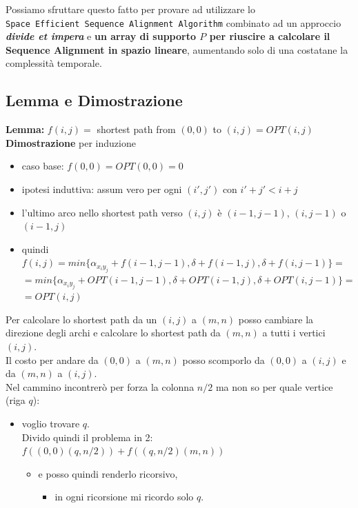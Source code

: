 Possiamo sfruttare questo fatto per provare ad utilizzare lo
\texttt{Space\ Efficient\ Sequence\ Alignment\ Algorithm} combinato ad
un approccio \emph{\textbf{divide et impera}} e \textbf{un array di
  supporto $P$ per riuscire a calcolare il Sequence Alignment in spazio
  lineare}, aumentando solo di una costatane la complessità temporale.

\subsection{Lemma e Dimostrazione}

\textbf{Lemma:} $f(i,j) =$ shortest path from $(0,0)$ to
$(i,j) = OPT(i,j)$\\
\textbf{Dimostrazione} per induzione
\begin{itemize}
  \item caso base:
        $f(0,0) = OPT(0,0) = 0$
  \item ipotesi induttiva: assum vero per ogni
        $(i', j')$ con $i'+j' < i+j$
  \item l'ultimo arco nello shortest path
        verso $(i,j)$ è $(i-1, j-1)$, $(i, j-1)$ o $(i-1, j)$
  \item quindi
        $f(i,j) = min\{ \alpha_{x_i y_j} + f(i-1, j-1), \delta + f(i-1, j), \delta +f(i, j-1)\} =$
        $= min\{ \alpha_{x_i y_j} + OPT(i-1, j-1), \delta + OPT(i-1, j), \delta + OPT(i, j-1)\} =$
        $= OPT(i,j)$
\end{itemize}

Per calcolare lo shortest path da un $(i,j)$ a $(m,n)$ posso
cambiare la direzione degli archi e calcolare lo shortest path da
$(m,n)$ a tutti i vertici $(i,j)$.\\

Il costo per andare da $(0,0)$ a $(m,n)$ posso scomporlo da
$(0,0)$ a $(i,j)$ e da $(m,n)$ a $(i,j)$.\\

Nel cammino incontrerò per forza la colonna $n/2$ ma non so per quale
vertice (riga $q$):
\begin{itemize}
    \item voglio trovare $q$.\\
     Divido quindi il problema in 2:\\
     $f((0,0)(q,n/2)) + f((q,n/2)(m,n))$
     \begin{itemize}
         \item e posso quindi renderlo ricorsivo,
         \begin{itemize}
             \item in ogni ricorsione mi ricordo solo $q$.
         \end{itemize}
     \end{itemize}
\end{itemize}

